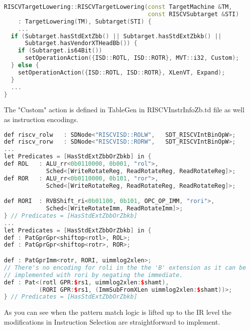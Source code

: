 \begin{lstlisting}[language=C++, caption={ROTR Legalization Conditional}]
RISCVTargetLowering::RISCVTargetLowering(const TargetMachine &TM,
                                         const RISCVSubtarget &STI)
    : TargetLowering(TM), Subtarget(STI) {
    ...
  if (Subtarget.hasStdExtZbb() || Subtarget.hasStdExtZbkb() ||
      Subtarget.hasVendorXTHeadBb()) {
    if (Subtarget.is64Bit())
      setOperationAction({ISD::ROTL, ISD::ROTR}, MVT::i32, Custom);
  } else {
    setOperationAction({ISD::ROTL, ISD::ROTR}, XLenVT, Expand);
  }
  ...
}
\end{lstlisting}

The "Custom" action is defined in TableGen in RISCVInstrInfoZb.td file as well as instruction encodings.

\begin{lstlisting}[language=C++, caption={ROR Encodings and Pattern}]
def riscv_rolw   : SDNode<"RISCVISD::ROLW",   SDT_RISCVIntBinOpW>;
def riscv_rorw   : SDNode<"RISCVISD::RORW",   SDT_RISCVIntBinOpW>;
...
let Predicates = [HasStdExtZbbOrZbkb] in {
def ROL   : ALU_rr<0b0110000, 0b001, "rol">,
            Sched<[WriteRotateReg, ReadRotateReg, ReadRotateReg]>;
def ROR   : ALU_rr<0b0110000, 0b101, "ror">,
            Sched<[WriteRotateReg, ReadRotateReg, ReadRotateReg]>;

def RORI  : RVBShift_ri<0b01100, 0b101, OPC_OP_IMM, "rori">,
            Sched<[WriteRotateImm, ReadRotateImm]>;
} // Predicates = [HasStdExtZbbOrZbkb]
...
let Predicates = [HasStdExtZbbOrZbkb] in {
def : PatGprGpr<shiftop<rotl>, ROL>;
def : PatGprGpr<shiftop<rotr>, ROR>;

def : PatGprImm<rotr, RORI, uimmlog2xlen>;
// There's no encoding for roli in the the 'B' extension as it can be
// implemented with rori by negating the immediate.
def : Pat<(rotl GPR:$rs1, uimmlog2xlen:$shamt),
          (RORI GPR:$rs1, (ImmSubFromXLen uimmlog2xlen:$shamt))>;
} // Predicates = [HasStdExtZbbOrZbkb]
\end{lstlisting}

As you can see when the pattern match logic is lifted up to the IR level the modifications in Instruction Selection are straightforward to implement. 



